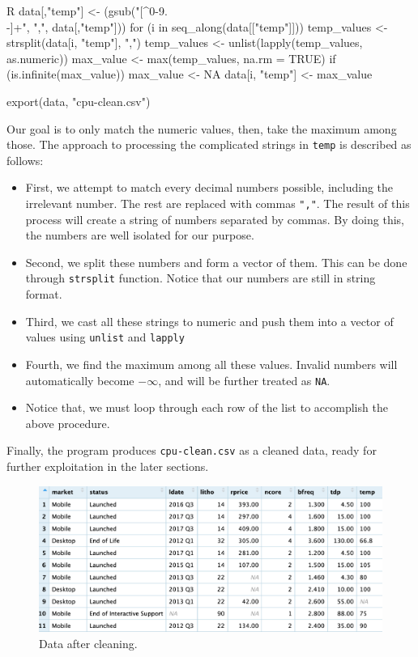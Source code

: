 \begin{code}{R}
data[,"temp"] <- (gsub("[^0-9.\\-]+", ",", data[,"temp"]))
for (i in seq_along(data[["temp"]])) {
    temp_values <- strsplit(data[i, "temp"], ",") 
    temp_values <- unlist(lapply(temp_values, as.numeric))
    max_value <- max(temp_values, na.rm = TRUE)
    if (is.infinite(max_value)) {
        max_value <- NA
    }
    data[i, "temp"] <- max_value
}

export(data, "cpu-clean.csv")
\end{code}

Our goal is to only match the numeric values, then, take the maximum among those. The approach to processing the complicated strings in \verb|temp| is described as follows:
\begin{itemize}
    \item First, we attempt to match every decimal numbers possible, including the irrelevant number. The rest are replaced with commas \verb|","|.
    The result of this process will create a string of numbers separated by commas. By doing this, the numbers are well isolated for our purpose.

    \item Second, we split these numbers and form a vector of them. This can be done through \texttt{strsplit} function. Notice that our numbers
    are still in string format.

    \item Third, we cast all these strings to numeric and push them into a vector of values using \texttt{unlist} and \texttt{lapply}
    
    \item Fourth, we find the maximum among all these values. Invalid numbers will automatically become \(-\infty\), and will be further treated as \texttt{NA}.
    
    \item Notice that, we must loop through each row of the list to accomplish the above procedure.
\end{itemize}

Finally, the program produces \verb|cpu-clean.csv| as a cleaned data, ready for further exploitation in the later sections.

\begin{figure}[H]
    \centering
    \includegraphics[max width=0.9\linewidth]{./graphics/cleaned_data.png}
    \caption{Data after cleaning.}
\end{figure}

